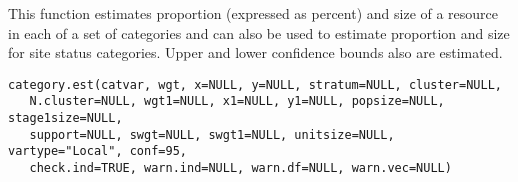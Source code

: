 \begin{Description}\relax
This function estimates proportion (expressed as percent) and size of a
resource in each of a set of categories and can also be used to estimate
proportion and size for site status categories.  Upper and lower confidence
bounds also are estimated.
\end{Description}
\begin{Usage}
\begin{verbatim}
category.est(catvar, wgt, x=NULL, y=NULL, stratum=NULL, cluster=NULL,
   N.cluster=NULL, wgt1=NULL, x1=NULL, y1=NULL, popsize=NULL, stage1size=NULL,
   support=NULL, swgt=NULL, swgt1=NULL, unitsize=NULL, vartype="Local", conf=95,
   check.ind=TRUE, warn.ind=NULL, warn.df=NULL, warn.vec=NULL)
\end{verbatim}
\end{Usage}
